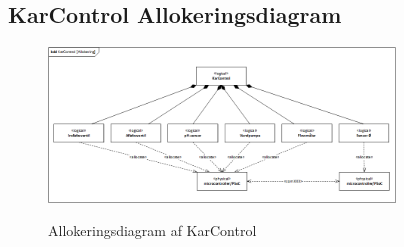 \subsection{KarControl Allokeringsdiagram}

\begin{figure}[H]
	\centering
	\includegraphics[width=0.82\textwidth]{Systemarkitektur/KarControl/KarControl_Allokeringsdiagram.png}
	\label{fig:KarControl AD}
	\caption{Allokeringsdiagram af KarControl}
\end{figure}
